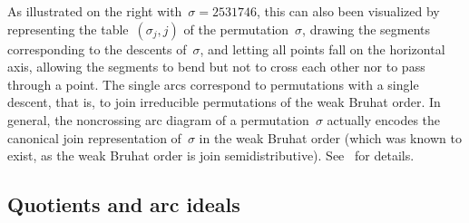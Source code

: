 \documentclass{amsart}
\theoremstyle{definition}
\begin{document}
{\vspace{.2cm}
\noindent
As illustrated on the right with~$\sigma = 2531746$, this can also been visualized by representing the table~$(\sigma_j,j)$ of the permutation~$\sigma$, drawing the segments corresponding to the descents of~$\sigma$, and letting all points fall on the horizontal axis, allowing the segments to bend but not to cross each other nor to pass through a point.
The single arcs correspond to permutations with a single descent, that is, to join irreducible permutations of the weak Bruhat order.
In general, the noncrossing arc diagram of a permutation~$\sigma$ actually encodes the canonical join representation of~$\sigma$ in the weak Bruhat order (which was known to exist, as the weak Bruhat order is join semidistributive).
See~\cite{Reading-arcDiagrams} for details.
}


\subsection{Quotients and arc ideals}
\label{subsec:arcIdeals}
\end{document}
